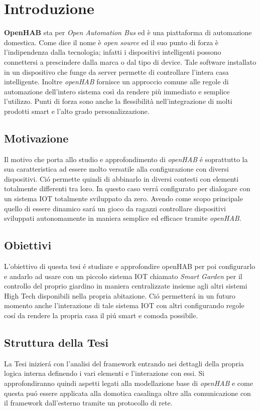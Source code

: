 \chapter{Introduzione}

\textbf{OpenHAB} sta per {\em Open Automation Bus} ed è una piattaforma di automazione domestica. Come dice il nome è {\em open source} ed il suo punto di forza è l'indipendenza dalla tecnologia; infatti i dispositivi intelligenti possono connettersi a prescindere dalla marca o dal tipo di device. Tale software installato in un dispositivo che funge da server permette di controllare l'intera casa intelligente. Inoltre {\em openHAB} fornisce un approccio comune alle regole di automazione dell'intero sistema così da rendere più immediato e semplice l'utilizzo. Punti di forza sono anche la flessibilità nell'integrazione di molti prodotti smart e l'alto grado personalizzazione.

\section{Motivazione}
Il motivo che porta allo studio e approfondimento di {\em openHAB} \'e soprattutto la sua caratteristica ad essere molto versatile alla configurazione con diversi dispositivi. Ci\'o permette quindi di abbinarlo in diversi contesti con elementi totalmente differenti tra loro. In questo caso verr\'a configurato per dialogare con un sistema IOT totalmente sviluppato da zero. Avendo come scopo principale quello di essere dinamico sar\'a un gioco da ragazzi controllare dispositivi sviluppati autonomamente in maniera semplice ed efficace tramite {\em openHAB}.

\section{Obiettivi}
L'obiettivo di questa tesi \'e studiare e approfondire openHAB per poi configurarlo e andarlo ad usare con un piccolo sistema IOT chiamato {\em Smart Garden} per il controllo del proprio giardino in maniera centralizzate insieme agli altri sistemi High Tech disponibili nella propria abitazione. Ci\'o permetter\'a in un futuro momento anche l'interazione di tale sistema IOT con altri configurando regole cos\'i da rendere la propria casa il pi\'u smart e comoda possibile.

\section{Struttura della Tesi}
La Tesi inizier\'a con l'analisi del framework entrando nei dettagli della propria logica interna definendo i vari elementi e l'interazione con essi. Si approfondiranno quindi aspetti legati alla modellazione base di {\em openHAB} e come questa pu\'o essere applicata alla domotica casalinga oltre alla comunicazione con il framework dall'esterno tramite un protocollo di rete.

